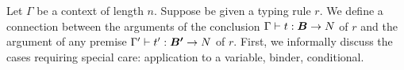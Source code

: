 %
%


Let $\Gamma$ be a context of length $n$.
Suppose be given a typing rule $r$.
We define a connection between the arguments of the conclusion $\Gamma \vdash t:\vec{B} 
\rightarrow \N$ of $r$ and the argument of any premise $\Gamma' \vdash t':\vec{B'} 
\rightarrow \N$ of $r$. First, we informally discuss the cases requiring special care:
application to a variable, binder, conditional.

